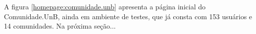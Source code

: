 A figura \ref{homepage:comunidade.unb} apresenta a página inicial do
Comunidade.UnB, ainda em ambiente de testes, que já consta com 153 usuários
e 14 comunidades.
%
Na próxima seção...

